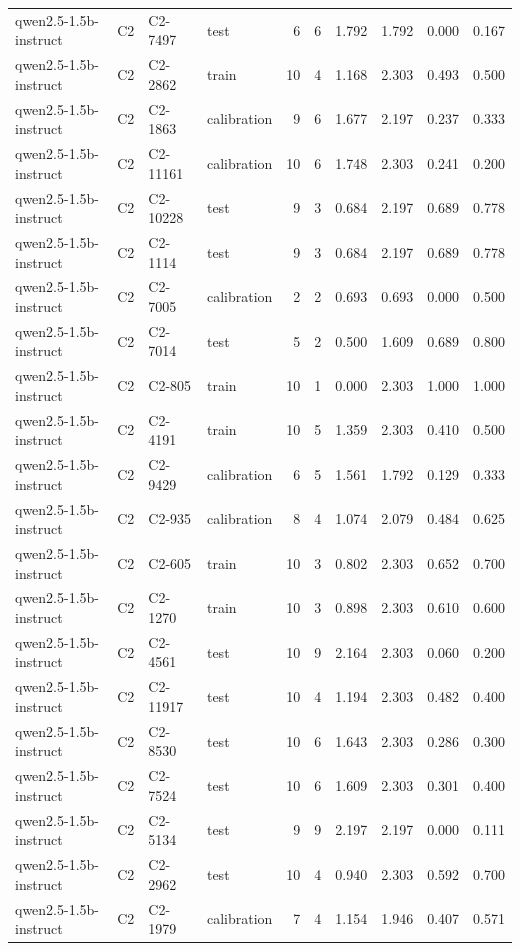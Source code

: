 \begin{table}
\begin{tabular}{llllrrrrrr}
qwen2.5-1.5b-instruct & C2 & C2-7497 & test & 6 & 6 & 1.792 & 1.792 & 0.000 & 0.167 \\
qwen2.5-1.5b-instruct & C2 & C2-2862 & train & 10 & 4 & 1.168 & 2.303 & 0.493 & 0.500 \\
qwen2.5-1.5b-instruct & C2 & C2-1863 & calibration & 9 & 6 & 1.677 & 2.197 & 0.237 & 0.333 \\
qwen2.5-1.5b-instruct & C2 & C2-11161 & calibration & 10 & 6 & 1.748 & 2.303 & 0.241 & 0.200 \\
qwen2.5-1.5b-instruct & C2 & C2-10228 & test & 9 & 3 & 0.684 & 2.197 & 0.689 & 0.778 \\
qwen2.5-1.5b-instruct & C2 & C2-1114 & test & 9 & 3 & 0.684 & 2.197 & 0.689 & 0.778 \\
qwen2.5-1.5b-instruct & C2 & C2-7005 & calibration & 2 & 2 & 0.693 & 0.693 & 0.000 & 0.500 \\
qwen2.5-1.5b-instruct & C2 & C2-7014 & test & 5 & 2 & 0.500 & 1.609 & 0.689 & 0.800 \\
qwen2.5-1.5b-instruct & C2 & C2-805 & train & 10 & 1 & 0.000 & 2.303 & 1.000 & 1.000 \\
qwen2.5-1.5b-instruct & C2 & C2-4191 & train & 10 & 5 & 1.359 & 2.303 & 0.410 & 0.500 \\
qwen2.5-1.5b-instruct & C2 & C2-9429 & calibration & 6 & 5 & 1.561 & 1.792 & 0.129 & 0.333 \\
qwen2.5-1.5b-instruct & C2 & C2-935 & calibration & 8 & 4 & 1.074 & 2.079 & 0.484 & 0.625 \\
qwen2.5-1.5b-instruct & C2 & C2-605 & train & 10 & 3 & 0.802 & 2.303 & 0.652 & 0.700 \\
qwen2.5-1.5b-instruct & C2 & C2-1270 & train & 10 & 3 & 0.898 & 2.303 & 0.610 & 0.600 \\
qwen2.5-1.5b-instruct & C2 & C2-4561 & test & 10 & 9 & 2.164 & 2.303 & 0.060 & 0.200 \\
qwen2.5-1.5b-instruct & C2 & C2-11917 & test & 10 & 4 & 1.194 & 2.303 & 0.482 & 0.400 \\
qwen2.5-1.5b-instruct & C2 & C2-8530 & test & 10 & 6 & 1.643 & 2.303 & 0.286 & 0.300 \\
qwen2.5-1.5b-instruct & C2 & C2-7524 & test & 10 & 6 & 1.609 & 2.303 & 0.301 & 0.400 \\
qwen2.5-1.5b-instruct & C2 & C2-5134 & test & 9 & 9 & 2.197 & 2.197 & 0.000 & 0.111 \\
qwen2.5-1.5b-instruct & C2 & C2-2962 & test & 10 & 4 & 0.940 & 2.303 & 0.592 & 0.700 \\
qwen2.5-1.5b-instruct & C2 & C2-1979 & calibration & 7 & 4 & 1.154 & 1.946 & 0.407 & 0.571 \\

\end{tabular}
\end{table}
